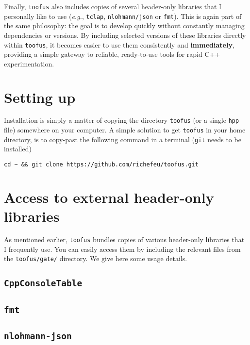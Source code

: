 \documentclass[a4paper,onecolumn,11pt]{doofus}
\begin{document}
Finally, \texttt{toofus} also includes copies of several header-only libraries that I personally like to use (\textit{e.g.}, \texttt{tclap}, \texttt{nlohmann/json} or \texttt{fmt}). This is again part of the same philosophy: the goal is to develop quickly without constantly managing dependencies or versions. By including selected versions of these libraries directly within \texttt{toofus}, it becomes easier to use them consistently and \textbf{immediately}, providing a simple gateway to reliable, ready-to-use tools for rapid C++ experimentation.





\section{Setting up}



Installation is simply a matter of copying the directory \texttt{toofus} (or a single \texttt{hpp} file) somewhere on your computer.
A simple solution to get \texttt{toofus} in your home directory, is to copy-past the following command in a terminal (\texttt{git} needs to be installed)
%
\begin{lstlisting}
cd ~ && git clone https://github.com/richefeu/toofus.git
\end{lstlisting}

\section{Access to external header-only libraries}

As mentioned earlier, \texttt{toofus} bundles copies of various header-only libraries that I frequently use. You can easily access them by including the relevant files from the \texttt{toofus/gate/} directory.
We give here some usage details.


\subsection{\texttt{CppConsoleTable}}

\subsection{\texttt{fmt}}

\subsection{\texttt{nlohmann-json}}
\end{document}
